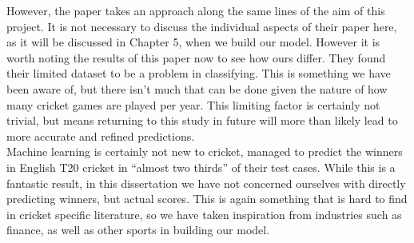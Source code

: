 However, the paper \cite{kumar} takes an approach along the same lines of the aim of this project. It is not necessary to discuss the individual aspects
of their paper here, as it will be discussed in Chapter 5, when we build our model. However it is worth noting the results of this paper now to see how
ours differ. They found their limited dataset to be a problem in classifying. This is something we have been aware of, but there isn't much that can be done
given the nature of how many cricket games are played per year. This limiting factor is certainly not trivial, but means returning to this study in future 
will more than likely lead to more accurate and refined predictions. \\

Machine learning is certainly not new to cricket, \cite{kampakis} managed to predict the winners in English T20 cricket in ``almost two thirds'' of their test cases. While this 
is a fantastic result, in this dissertation we have not concerned ourselves with directly predicting winners, but actual scores. This is again something that is hard to find 
in cricket specific literature, so we have taken inspiration from industries such as finance, as well as other sports in building our model. 